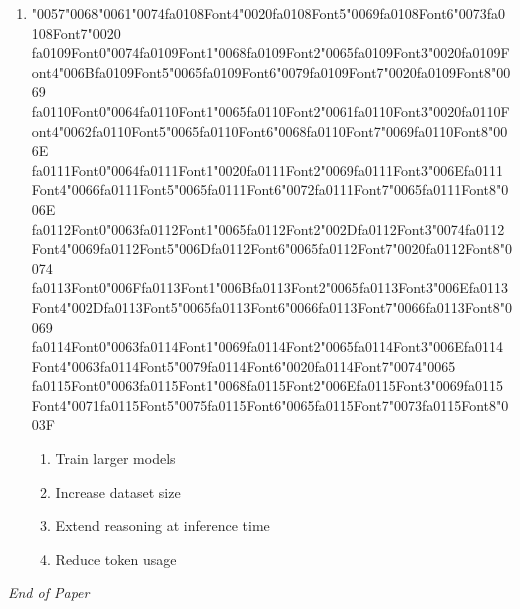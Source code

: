 \documentclass[12pt]{article}
\begin{document}
\begin{enumerate}[label=Q\arabic*.]
\item {\char"0057}{\char"0068}{\char"0061}{\char"0074}{\csname fa0108Font4\endcsname\char"0020}{\csname fa0108Font5\endcsname\char"0069}{\csname fa0108Font6\endcsname\char"0073}{\csname fa0108Font7\endcsname\char"0020} {\csname fa0109Font0\endcsname\char"0074}{\csname fa0109Font1\endcsname\char"0068}{\csname fa0109Font2\endcsname\char"0065}{\csname fa0109Font3\endcsname\char"0020}{\csname fa0109Font4\endcsname\char"006B}{\csname fa0109Font5\endcsname\char"0065}{\csname fa0109Font6\endcsname\char"0079}{\csname fa0109Font7\endcsname\char"0020}{\csname fa0109Font8\endcsname\char"0069} {\csname fa0110Font0\endcsname\char"0064}{\csname fa0110Font1\endcsname\char"0065}{\csname fa0110Font2\endcsname\char"0061}{\csname fa0110Font3\endcsname\char"0020}{\csname fa0110Font4\endcsname\char"0062}{\csname fa0110Font5\endcsname\char"0065}{\csname fa0110Font6\endcsname\char"0068}{\csname fa0110Font7\endcsname\char"0069}{\csname fa0110Font8\endcsname\char"006E} {\csname fa0111Font0\endcsname\char"0064}{\csname fa0111Font1\endcsname\char"0020}{\csname fa0111Font2\endcsname\char"0069}{\csname fa0111Font3\endcsname\char"006E}{\csname fa0111Font4\endcsname\char"0066}{\csname fa0111Font5\endcsname\char"0065}{\csname fa0111Font6\endcsname\char"0072}{\csname fa0111Font7\endcsname\char"0065}{\csname fa0111Font8\endcsname\char"006E} {\csname fa0112Font0\endcsname\char"0063}{\csname fa0112Font1\endcsname\char"0065}{\csname fa0112Font2\endcsname\char"002D}{\csname fa0112Font3\endcsname\char"0074}{\csname fa0112Font4\endcsname\char"0069}{\csname fa0112Font5\endcsname\char"006D}{\csname fa0112Font6\endcsname\char"0065}{\csname fa0112Font7\endcsname\char"0020}{\csname fa0112Font8\endcsname\char"0074} {\csname fa0113Font0\endcsname\char"006F}{\csname fa0113Font1\endcsname\char"006B}{\csname fa0113Font2\endcsname\char"0065}{\csname fa0113Font3\endcsname\char"006E}{\csname fa0113Font4\endcsname\char"002D}{\csname fa0113Font5\endcsname\char"0065}{\csname fa0113Font6\endcsname\char"0066}{\csname fa0113Font7\endcsname\char"0066}{\csname fa0113Font8\endcsname\char"0069} {\csname fa0114Font0\endcsname\char"0063}{\csname fa0114Font1\endcsname\char"0069}{\csname fa0114Font2\endcsname\char"0065}{\csname fa0114Font3\endcsname\char"006E}{\csname fa0114Font4\endcsname\char"0063}{\csname fa0114Font5\endcsname\char"0079}{\csname fa0114Font6\endcsname\char"0020}{\csname fa0114Font7\endcsname\char"0074}{\char"0065} {\csname fa0115Font0\endcsname\char"0063}{\csname fa0115Font1\endcsname\char"0068}{\csname fa0115Font2\endcsname\char"006E}{\csname fa0115Font3\endcsname\char"0069}{\csname fa0115Font4\endcsname\char"0071}{\csname fa0115Font5\endcsname\char"0075}{\csname fa0115Font6\endcsname\char"0065}{\csname fa0115Font7\endcsname\char"0073}{\csname fa0115Font8\endcsname\char"003F}
\begin{enumerate}[label=(\Alph*)]
    \item Train larger models
    \item Increase dataset size
    \item Extend reasoning at inference time
    \item Reduce token usage
\end{enumerate}
\end{enumerate}

\vfill
\noindent\textit{End of Paper}
\end{document}
